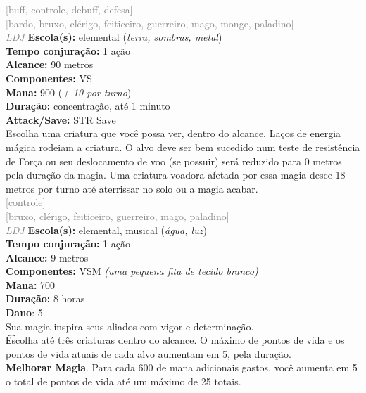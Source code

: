 \documentclass{RPG_Adventure}[2021/10/20]
\begin{document}
{\scriptsize \textcolor{gray}{[buff, controle, debuff, defesa]\\}}
{\scriptsize \textcolor{gray}{[bardo, bruxo, clérigo, feiticeiro, guerreiro, mago, monge, paladino]\\}}
{\tiny \textcolor{gray}{\textit{LDJ}}}
{\small \t \textbf{Escola(s):} elemental (\textit{terra, sombras, metal})\\\t \textbf{Tempo conjuração:} 1 ação\\\t \textbf{Alcance:} 90 metros\\\t \textbf{Componentes:} VS\\\t \textbf{Mana:} 900 (\textit{+ 10 por turno})\\\t \textbf{Duração:} concentração, até 1 minuto\\\t \textbf{Attack/Save:} STR Save\\}
{\normalsize Escolha uma criatura que você possa ver, dentro do alcance. Laços de energia mágica rodeiam a criatura. O alvo deve ser bem sucedido num teste de resistência de Força ou seu deslocamento de voo (se possuir) será reduzido para 0 metros pela duração da magia. Uma criatura voadora afetada por essa magia desce 18 metros por turno até aterrissar no solo ou a magia acabar.\\}
{\scriptsize \textcolor{gray}{[controle]\\}}
{\scriptsize \textcolor{gray}{[bruxo, clérigo, feiticeiro, guerreiro, mago, paladino]\\}}
{\tiny \textcolor{gray}{\textit{LDJ}}}
{\small \t \textbf{Escola(s):} elemental, musical (\textit{água, luz})\\\t \textbf{Tempo conjuração:} 1 ação\\\t \textbf{Alcance:} 9 metros\\\t \textbf{Componentes:} VSM \textit{(uma pequena fita de tecido branco)}\\\t \textbf{Mana:} 700\\\t \textbf{Duração:} 8 horas\\\t \textbf{Dano}: 5\\}
{\normalsize Sua magia inspira seus aliados com vigor e determinação.\\\t Escolha até três criaturas dentro do alcance. O máximo de pontos de vida e os pontos de vida atuais de cada alvo aumentam em 5, pela duração.\\\t \textbf{Melhorar Magia}. Para cada 600 de mana adicionais gastos, você aumenta em 5 o total de pontos de vida até um máximo de 25 totais.\\}
\end{document}
